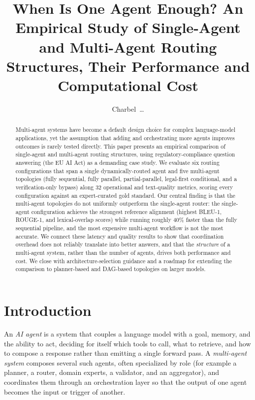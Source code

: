 \documentclass[journal,10pt,compsoc,onecolumn]{IEEEtran}
\begin{document}
\title{When Is One Agent Enough? An Empirical Study of Single-Agent and Multi-Agent Routing Structures, Their Performance and Computational Cost}

\author{Charbel~\dots \\
\textit{}}

\maketitle

\begin{abstract}
Multi-agent systems have become a default design choice for complex language-model applications, yet the assumption that adding and orchestrating more agents improves outcomes is rarely tested directly. This paper presents an empirical comparison of single-agent and multi-agent routing structures, using regulatory-compliance question answering (the EU AI Act) as a demanding case study. We evaluate six routing configurations that span a single dynamically-routed agent and five multi-agent topologies (fully sequential, fully parallel, partial-parallel, legal-first conditional, and a verification-only bypass) along 32 operational and text-quality metrics, scoring every configuration against an expert-curated gold standard. Our central finding is that the multi-agent topologies do not uniformly outperform the single-agent router: the single-agent configuration achieves the strongest reference alignment (highest BLEU-1, ROUGE-1, and lexical-overlap scores) while running roughly 40\% faster than the fully sequential pipeline, and the most expensive multi-agent workflow is not the most accurate. We connect these latency and quality results to show that coordination overhead does not reliably translate into better answers, and that the \emph{structure} of a multi-agent system, rather than the number of agents, drives both performance and cost. We close with architecture-selection guidance and a roadmap for extending the comparison to planner-based and DAG-based topologies on larger models.
\end{abstract}

\section{Introduction}
An \emph{AI agent} is a system that couples a language model with a goal, memory, and the ability to act, deciding for itself which tools to call, what to retrieve, and how to compose a response rather than emitting a single forward pass. A \emph{multi-agent system} composes several such agents, often specialized by role (for example a planner, a router, domain experts, a validator, and an aggregator), and coordinates them through an orchestration layer so that the output of one agent becomes the input or trigger of another.
\end{document}
